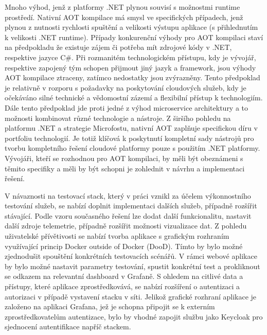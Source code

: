 Mnoho výhod, jenž z platformy .NET plynou souvisí s možnostmi runtime prostředí. Nativní AOT kompilace má smysl ve specifických případech, jenž plynou z nutnosti rychlosti spuštění a velikosti výstupu aplikace (s přihlednutím k velikosti .NET runtime). Případy konkurenční výhody pro AOT kompilaci staví na předpokladu že existuje zájem či potřeba mít zdrojové kódy v .NET, respektive jazyce C\#. Při rozmanitém technologickém přístupu, kdy je vývojář, respektive zapojený tým schopen přijmout jiný jazyk a framework, jsou výhody AOT kompilace ztraceny, zatímco nedostatky jsou zvýrazněny. Tento předpoklad je relativně v rozporu s požadavky na poskytování cloudových služeb, kdy je očekáváno silné technické a vědomostní zázemí a flexibilní přístup k technologiím. Dále tento předpoklad jde proti jedné z výhod microservice architektury a to možnosti kombinovat různé technologie a nástroje. Z širšího pohledu na platformu .NET a strategie Microfostu, nativní AOT zaplňuje specifickou díru v portfoliu technologií. Je totiž klíčová k poskytnutí kompletní sady nástrojů pro tvorbu kompletního řešení cloudové platformy pouze s použitím .NET platformy. Vývojáři, kteří se rozhodnou pro AOT kompilaci, by měli být obeznámeni s těmito specifiky a měli by být schopni je zohlednit v návrhu a implementaci řešení.

V návaznosti na testovací stack, který v práci vznikl za účelem výkonnostního testování služeb, se nabízí doplnit implementaci dalších služeb, případně rozšířit stávající. Podle vzoru současného řešení lze dodat další funkcionalitu, nastavit další zdroje telemetrie, případně rozšířit možnosti vizualizace dat. Z pohledu uživatelské přívětivosti se nabízí tvorba aplikace s grafickým rozhraním využívající princip Docker outside of Docker (DooD). Tímto by bylo možné zjednodušit spouštění konkrétních testovacích scénářů. V rámci webové aplikace by bylo možné nastavit parametry testování, spustit konkrétní test a prokliknout se odkazem na relevantní dashboard v Grafaně. S ohledem na citlivé data a přístupy, které aplikace zprostředkovává, se nabízí rozšíření o autentizaci a autorizaci v případě vystavení stacku v síti. Jelikož grafické rozhraní aplikace je založeno na aplikaci Grafana, jež je schopna připojit se k externím zprostředkovatelům autentizace, bylo by vhodné zapojit službu jako Keycloak pro sjednocení autentifikace napříč stackem.

